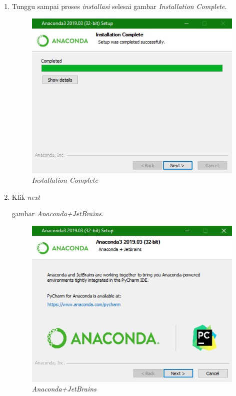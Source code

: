 \begin{enumerate}
\item Tunggu sampai proses \textit{installasi} selesai
 gambar \textit{Installation Complete}.

\begin{figure}[!htbp]
    \centering
    \includegraphics[scale=0.5]{figures/g.jpg}
    \caption{\textit{Installation Complete}}
    \label{Figureanaconda7}
\end{figure}

\item Klik \textit{next}

 gambar \textit{Anaconda+JetBrains}.

\begin{figure}[!htbp]
    \centering
    \includegraphics[scale=0.5]{figures/h.jpg}
    \caption{\textit{Anaconda+JetBrains}}
    \label{Figureanaconda8}
\end{figure}


\end{enumerate}
